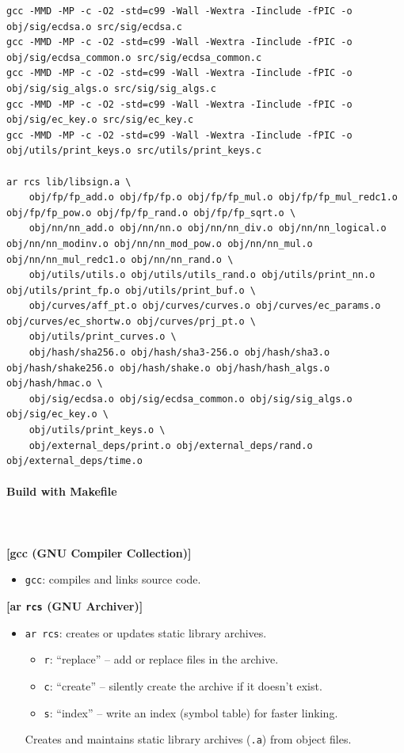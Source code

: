 \begin{lstlisting}[numbers=none]
gcc -MMD -MP -c -O2 -std=c99 -Wall -Wextra -Iinclude -fPIC -o obj/sig/ecdsa.o src/sig/ecdsa.c
gcc -MMD -MP -c -O2 -std=c99 -Wall -Wextra -Iinclude -fPIC -o obj/sig/ecdsa_common.o src/sig/ecdsa_common.c
gcc -MMD -MP -c -O2 -std=c99 -Wall -Wextra -Iinclude -fPIC -o obj/sig/sig_algs.o src/sig/sig_algs.c
gcc -MMD -MP -c -O2 -std=c99 -Wall -Wextra -Iinclude -fPIC -o obj/sig/ec_key.o src/sig/ec_key.c
gcc -MMD -MP -c -O2 -std=c99 -Wall -Wextra -Iinclude -fPIC -o obj/utils/print_keys.o src/utils/print_keys.c

ar rcs lib/libsign.a \
	obj/fp/fp_add.o obj/fp/fp.o obj/fp/fp_mul.o obj/fp/fp_mul_redc1.o obj/fp/fp_pow.o obj/fp/fp_rand.o obj/fp/fp_sqrt.o \
	obj/nn/nn_add.o obj/nn/nn.o obj/nn/nn_div.o obj/nn/nn_logical.o obj/nn/nn_modinv.o obj/nn/nn_mod_pow.o obj/nn/nn_mul.o obj/nn/nn_mul_redc1.o obj/nn/nn_rand.o \
	obj/utils/utils.o obj/utils/utils_rand.o obj/utils/print_nn.o obj/utils/print_fp.o obj/utils/print_buf.o \
	obj/curves/aff_pt.o obj/curves/curves.o obj/curves/ec_params.o obj/curves/ec_shortw.o obj/curves/prj_pt.o \
	obj/utils/print_curves.o \
	obj/hash/sha256.o obj/hash/sha3-256.o obj/hash/sha3.o obj/hash/shake256.o obj/hash/shake.o obj/hash/hash_algs.o obj/hash/hmac.o \
	obj/sig/ecdsa.o obj/sig/ecdsa_common.o obj/sig/sig_algs.o obj/sig/ec_key.o \
	obj/utils/print_keys.o \
	obj/external_deps/print.o obj/external_deps/rand.o obj/external_deps/time.o 
\end{lstlisting}

\newpage
\paragraph{Build with Makefile}\ \\
\ \\
\textbf{[gcc (GNU Compiler Collection)]}
\begin{itemize}
	\item \texttt{gcc}: compiles and links source code.
\end{itemize}
\textbf{[ar \texttt{rcs} (GNU Archiver)]}
\begin{itemize}
	\item \texttt{ar rcs}: creates or updates static library archives.
	\begin{itemize}
		\item \texttt{r}: ``replace'' -- add or replace files in the archive.
		\item \texttt{c}: ``create'' -- silently create the archive if it doesn’t exist.
		\item \texttt{s}: ``index'' -- write an index (symbol table) for faster linking.
	\end{itemize}
	Creates and maintains static library archives (\texttt{.a}) from object files.
\end{itemize}

